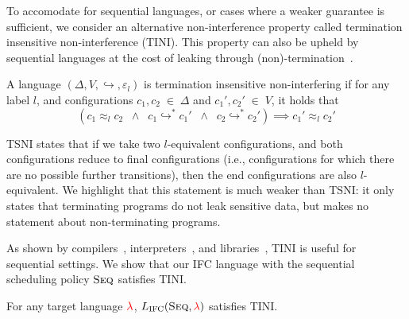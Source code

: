 \documentclass{sigplanconf}
\newcommand{\Varid}[1]{\mathit{#1}}
\newcommand{\Red}[1]{{\color{red} #1}}
\begin{document}
%
To accomodate for sequential languages, or cases where a weaker guarantee
is sufficient, we consider an alternative non-interference property called termination insensitive
non-interference (TINI).  This property can also be upheld by sequential languages at the cost
of leaking through (non)-termination~\cite{Askarov:2008}.
%
\begin{definition}
  A language \ensuremath{(\Delta,V,\hookrightarrow,\varepsilon_{\Varid{l}})} is termination
  insensitive non-interfering if for any label \ensuremath{\Varid{l}}, and configurations
  \ensuremath{c_{1},c_{2}\;\in\;\Delta} and \ensuremath{c_{1}',c_{2}'\;\in\;V}, it holds that
  \[
    (\ensuremath{c_{1}} \approx_{\ensuremath{\Varid{l}}} \ensuremath{c_{2}}
    \;\;\land\;\;
    \ensuremath{c_{1}} \ensuremath{\hookrightarrow}^* \ensuremath{c_{1}'}
    \;\;\land\;\;
    \ensuremath{c_{2}} \ensuremath{\hookrightarrow}^* \ensuremath{c_{2}'})
    \implies
    \ensuremath{c_{1}'} \approx_{\ensuremath{\Varid{l}}} \ensuremath{c_{2}'}
  \]
\end{definition}

TSNI states that if we take two \ensuremath{\Varid{l}}-equivalent configurations, and both
configurations reduce to final configurations (i.e.,
configurations for which there are no
possible further transitions), then the end configurations are also
\ensuremath{\Varid{l}}-equivalent.
%
We highlight that this statement is much weaker than TSNI: it only states that
terminating programs do not leak sensitive data, but makes no statement
about non-terminating programs.

As shown by compilers~\cite{jif,FlowCaml}, interpreters~\cite{JSFlow}, and
libraries~\cite{Russo+:Haskell08,lio}, TINI is useful for sequential
settings. We show that our IFC language with the sequential scheduling policy
\ensuremath{\textsc{Seq}} satisfies TINI.
%
\begin{theorem}
  \label{thm:seq-tini}
For any target language \ensuremath{\Red{\lambda}}, \ensuremath{L_\text{IFC}(\textsc{Seq},\Red{\lambda})} satisfies TINI.
\end{theorem}
\end{document}
